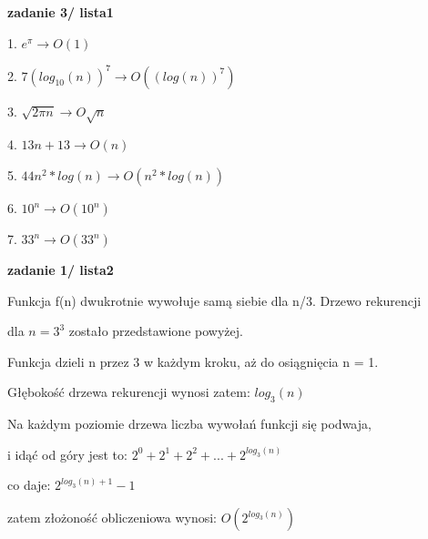 \documentclass{article}
\begin{document}
\vspace{1\baselineskip}
\textbf{zadanie 3/ lista1} \par
1. $e^{\pi}   \rightarrow O(1)$ \par
2. $7(log_{10}(n))^7  \rightarrow O((log(n))^7)$ \par
3. $\sqrt{2\pi n}  \rightarrow O{\sqrt{n}}$ \par
4. $13n + 13  \rightarrow O(n)$ \par
5. $44n^2 * log(n)  \rightarrow O(n^2 * log(n))$ \par
6. $10^n  \rightarrow O(10^n)$ \par
7. $33^n  \rightarrow O(33^n)$ \par 
\vspace{1\baselineskip}
\textbf{zadanie 1/ lista2} \par
{}
    \par
    \vspace{1\baselineskip}
    Funkcja f(n) dwukrotnie wywołuje samą siebie dla n/3. Drzewo rekurencji  \par
    dla $n = 3^3$ zostało przedstawione powyżej. \par
    Funkcja dzieli n przez 3 w każdym kroku, aż do osiągnięcia n = 1. \par
    Głębokość drzewa rekurencji wynosi zatem: $log_3(n)$ \par
    Na każdym poziomie drzewa liczba wywołań funkcji się podwaja, \par
    i idąć od góry jest to: $2^0 + 2^1 + 2^2 + ... + 2^{log_3(n)}$ \par
    co daje: $2^{log_3(n) + 1} - 1$ \par
    zatem złożoność obliczeniowa wynosi: $O(2^{log_3(n)})$ \par
\end{document}
